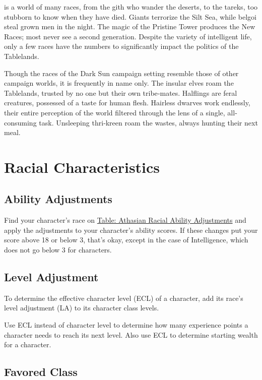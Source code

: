  is a world of many races, from the gith who wander the deserts, to the tareks, too stubborn to know when they have died. Giants terrorize the Silt Sea, while belgoi steal grown men in the night. The magic of the Pristine Tower produces the New Races; most never see a second generation. Despite the variety of intelligent life, only a few races have the numbers to significantly impact the politics of the Tablelands.

Though the races of the Dark Sun campaign setting resemble those of other campaign worlds, it is frequently in name only. The insular elves roam the Tablelands, trusted by no one but their own tribe‐mates. Halflings are feral creatures, possessed of a taste for human flesh. Hairless dwarves work endlessly, their entire perception of the world filtered through the lens of a single, all-consuming task. Unsleeping thri‐kreen roam the wastes, always hunting their next meal.

\section{Racial Characteristics}

\subsection{Ability Adjustments}

Find your character's race on \hyperref[tab:Athasian Racial Ability Adjustments]{Table: Athasian Racial Ability Adjustments} and apply the adjustments to your character's ability scores. If these changes put your score above 18 or below 3, that's okay, except in the case of Intelligence, which does not go below 3 for characters.

\subsection{Level Adjustment}

To determine the effective character level (ECL) of a character, add its race's level adjustment (LA) to its character class levels.

Use ECL instead of character level to determine how many experience points a character needs to reach its next level. Also use ECL to determine starting wealth for a character.

\subsection{Favored Class}


